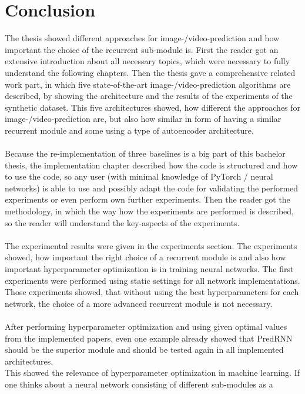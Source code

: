 \section{Conclusion} \label{section::conclusion}
 The thesis showed different approaches for image-/video-prediction and how important the choice of the recurrent sub-module is.
 First the reader got an extensive introduction
 about all necessary topics, which were necessary to fully understand the following chapters. Then the thesis gave a comprehensive related work part, in which
 five state-of-the-art image-/video-prediction algorithms are described, by showing the architecture and the results of the experiments of the synthetic dataset.
 This five architectures showed, how different the approaches for image-/video-prediction are, but also how similar in form of
 having a similar recurrent module and some using a type of autoencoder architecture.
 \\\\
 Because the re-implementation
 of three baselines is a big part of this bachelor thesis, the implementation chapter described how the code is structured and how to use the code, so any
 user (with minimal knowledge of PyTorch / neural networks) is able to use and possibly adapt the code for validating the performed experiments or even perform
 own further experiments. Then the reader got the methodology, in which the way how the experiments are performed is described, so the reader will 
 understand the key-aspects of the experiments.
 \\\\
 The experimental results were given in the experiments section.
 The experiments showed, how important the right choice of a recurrent module is and also how important hyperparameter optimization is in training neural networks.
 The first experiments were performed using static settings for all network implementations. Those experiments showed, that without using the \glqq best\grqq{} 
 hyperparameters for each network, the choice of a more advanced recurrent module is not necessary.
 \\\\ 
 After performing hyperparameter optimization and using given \glqq optimal\grqq{} values 
 from the implemented papers, even one example already showed that
 PredRNN should be the superior module and should be tested again in all implemented architectures.\\
 This showed the relevance of hyperparameter optimization in machine learning. If one thinks about a neural network consisting of different sub-modules as a

